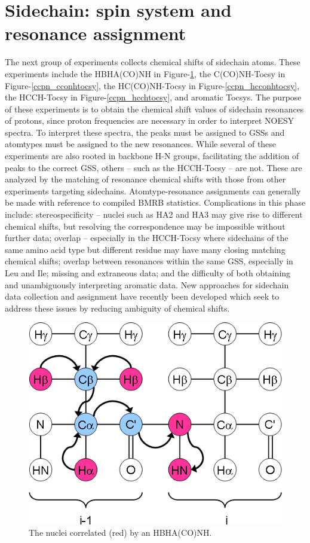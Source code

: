 \section{Sidechain: spin system and resonance assignment}

The next group of experiments collects chemical shifts of sidechain atoms.  
These experiments include 
the HBHA(CO)NH \cite{hbhaconh} in Figure-\ref{ccpn_hbhaconh}, 
the C(CO)NH-Tocsy \cite{cconhtocsy} in Figure-\ref{ccpn_cconhtocsy}, 
the HC(CO)NH-Tocsy \cite{hcconhtocsy} in Figure-\ref{ccpn_hcconhtocsy}, 
the HCCH-Tocsy \cite{hcchtocsy} in Figure-\ref{ccpn_hcchtocsy}, 
and aromatic Tocsys.  The purpose of these experiments is to 
obtain the chemical shift values of sidechain resonances of protons, since 
proton frequencies are necessary in order to interpret NOESY spectra.  To 
interpret these spectra, the peaks must be assigned to GSSs and atomtypes 
must be assigned to the new resonances. While several of these experiments 
are also rooted in backbone H-N groups, facilitating the addition of peaks 
to the correct GSS, others -- such as the HCCH-Tocsy -- are not.  These are 
analyzed by the matching of resonance chemical shifts with those from other 
experiments targeting sidechains.  Atomtype-resonance assignments can generally 
be made with reference to compiled BMRB statistics.  Complications in this 
phase include: stereospecificity -- nuclei such as HA2 and HA3 may give rise 
to different chemical shifts, but resolving the correspondence may be 
impossible without further data; overlap -- especially in the HCCH-Tocsy 
where sidechains of the same amino acid type but different residue may have 
many closing matching chemical shifts; overlap between resonances within the 
same GSS, especially in Leu and Ile; missing and extraneous data; and the 
difficulty of both obtaining and unambiguously interpreting aromatic data.  
New approaches for sidechain data collection and assignment have recently 
been developed \cite{mobli2010non, hiller2008apsy} which seek to address 
these issues by reducing ambiguity of chemical shifts.
\begin{figure}
  \includegraphics[scale=0.5]{figures/ccpn_hbhaconh}
  \caption[The nuclei correlated by an HBHA(CO)NH.]
          {The nuclei correlated (red) by an HBHA(CO)NH.}
  \label{ccpn_hbhaconh}
\end{figure}
